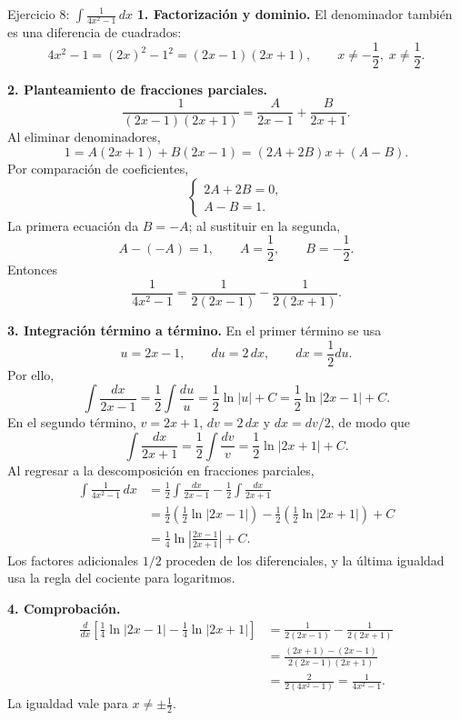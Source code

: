 \begin{examplebox}{Ejercicio 8: $\displaystyle \int\frac{1}{4x^2-1}\,dx$}
\textbf{1. Factorización y dominio.} El denominador también es una diferencia de cuadrados:
\[
 4x^2-1=(2x)^2-1^2=(2x-1)(2x+1),
 \qquad x\ne-\frac12,\;x\ne\frac12.
\]

\textbf{2. Planteamiento de fracciones parciales.}
\[
 \frac{1}{(2x-1)(2x+1)}
 =\frac{A}{2x-1}+\frac{B}{2x+1}.
\]
Al eliminar denominadores,
\[
 1=A(2x+1)+B(2x-1)=(2A+2B)x+(A-B).
\]
Por comparación de coeficientes,
\[
 \begin{cases}
 2A+2B=0,\\
 A-B=1.
 \end{cases}
\]
La primera ecuación da $B=-A$; al sustituir en la segunda,
\[
 A-(-A)=1,\qquad A=\frac12,\qquad B=-\frac12.
\]
Entonces
\[
 \frac1{4x^2-1}=\frac1{2(2x-1)}-\frac1{2(2x+1)}.
\]

\textbf{3. Integración término a término.} En el primer término se usa
\[
 u=2x-1,\qquad du=2\,dx,
 \qquad dx=\frac12du.
\]
Por ello,
\[
 \int\frac{dx}{2x-1}=\frac12\int\frac{du}{u}
 =\frac12\ln|u|+C=\frac12\ln|2x-1|+C.
\]
En el segundo término, $v=2x+1$, $dv=2\,dx$ y $dx=dv/2$, de modo que
\[
 \int\frac{dx}{2x+1}=\frac12\int\frac{dv}{v}
 =\frac12\ln|2x+1|+C.
\]
Al regresar a la descomposición en fracciones parciales,
\begin{align*}
 \int\frac{1}{4x^2-1}\,dx
 &=\frac12\int\frac{dx}{2x-1}-\frac12\int\frac{dx}{2x+1}\\
 &=\frac12\left(\frac12\ln|2x-1|\right)
   -\frac12\left(\frac12\ln|2x+1|\right)+C\\
 &=\boxed{\frac14\ln\left|\frac{2x-1}{2x+1}\right|+C}.
\end{align*}
Los factores adicionales $1/2$ proceden de los diferenciales, y la última igualdad usa la regla del cociente para logaritmos.

\textbf{4. Comprobación.}
\begin{align*}
 \frac{d}{dx}\left[\frac14\ln|2x-1|-\frac14\ln|2x+1|\right]
 &=\frac1{2(2x-1)}-\frac1{2(2x+1)}\\
 &=\frac{(2x+1)-(2x-1)}{2(2x-1)(2x+1)}\\
 &=\frac2{2(4x^2-1)}=\frac1{4x^2-1}.
\end{align*}
La igualdad vale para $x\ne\pm\frac12$.
\end{examplebox}


